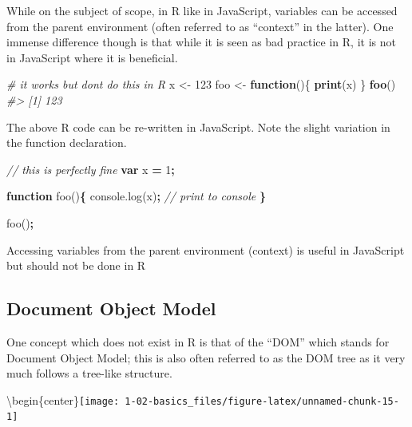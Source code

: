 \documentclass[
]{krantz}
\makeatletter
\newenvironment{Shaded}{\begin{snugshade}}{\end{snugshade}}
\newcommand{\AttributeTok}[1]{\textcolor[rgb]{0.61,0.61,0.61}{#1}}
\newcommand{\CommentTok}[1]{\textcolor[rgb]{0.37,0.37,0.37}{\textit{#1}}}
\newcommand{\ControlFlowTok}[1]{\textcolor[rgb]{0.27,0.27,0.27}{\textbf{#1}}}
\newcommand{\DecValTok}[1]{\textcolor[rgb]{0.06,0.06,0.06}{#1}}
\newcommand{\KeywordTok}[1]{\textcolor[rgb]{0.27,0.27,0.27}{\textbf{#1}}}
\newcommand{\NormalTok}[1]{#1}
\newcommand{\OperatorTok}[1]{\textcolor[rgb]{0.43,0.43,0.43}{\textbf{#1}}}
\newcommand{\StringTok}[1]{\textcolor[rgb]{0.5,0.5,0.5}{#1}}
\newcommand{\VariableTok}[1]{\textcolor[rgb]{0,0,0}{#1}}
\newenvironment{kframe}{%
\medskip{}
\setlength{\fboxsep}{.8em}
 \def\at@end@of@kframe{}%
 \ifinner\ifhmode%
  \def\at@end@of@kframe{\end{minipage}}%
  \begin{minipage}{\columnwidth}%
 \fi\fi%
 \def\FrameCommand##1{\hskip\@totalleftmargin \hskip-\fboxsep
 \colorbox{shadecolor}{##1}\hskip-\fboxsep
     \hskip-\linewidth \hskip-\@totalleftmargin \hskip\columnwidth}%
 \MakeFramed {\advance\hsize-\width
   \@totalleftmargin\z@ \linewidth\hsize
   \@setminipage}}%
 {\par\unskip\endMakeFramed%
 \at@end@of@kframe}
\renewenvironment{Shaded}{\begin{kframe}}{\end{kframe}}
\newenvironment{rmdblock}[1]
  {
  \begin{itemize}
  \renewcommand{\labelitemi}{
    \raisebox{-.7\height}[0pt][0pt]{
      {\setkeys{Gin}{width=3em,keepaspectratio}\texttt{[image: images/\#1]}}
    }
  }
  \setlength{\fboxsep}{1em}
  \begin{kframe}
  \item
  }
  {
  \end{kframe}
  \end{itemize}
  }
\newenvironment{rmdnote}
  {\begin{rmdblock}{note}}
  {\end{rmdblock}}
\makeatother
\begin{document}
While on the subject of scope, in R like in JavaScript, variables can be accessed from the parent environment (often referred to as ``context'' in the latter). One immense difference though is that while it is seen as bad practice in R, it is not in JavaScript where it is beneficial.

\begin{Shaded}
\begin{Highlighting}[]
\CommentTok{\# it works but don\textquotesingle{}t do this in R}
\NormalTok{x <{-}}\StringTok{ }\DecValTok{123}
\NormalTok{foo <{-}}\StringTok{ }\ControlFlowTok{function}\NormalTok{()\{}
  \KeywordTok{print}\NormalTok{(x)}
\NormalTok{\}}
\KeywordTok{foo}\NormalTok{()}
\CommentTok{\#> [1] 123}
\end{Highlighting}
\end{Shaded}

The above R code can be re-written in JavaScript. Note the slight variation in the function declaration.

\begin{Shaded}
\begin{Highlighting}[]
\CommentTok{// this is perfectly fine}
\KeywordTok{var}\NormalTok{ x }\OperatorTok{=} \DecValTok{1}\OperatorTok{;}

\KeywordTok{function} \AttributeTok{foo}\NormalTok{()}\OperatorTok{\{}
  \VariableTok{console}\NormalTok{.}\AttributeTok{log}\NormalTok{(x)}\OperatorTok{;} \CommentTok{// print to console}
\OperatorTok{\}}

\AttributeTok{foo}\NormalTok{()}\OperatorTok{;}
\end{Highlighting}
\end{Shaded}

\begin{rmdnote}
Accessing variables from the parent environment (context) is useful in
JavaScript but should not be done in R
\end{rmdnote}

\hypertarget{basics-object-model}{%
\subsection{Document Object Model}\label{basics-object-model}}

One concept which does not exist in R is that of the ``DOM'' which stands for Document Object Model; this is also often referred to as the DOM tree as it very much follows a tree-like structure.

\textbackslash begin\{center\}\texttt{[image: 1-02-basics\_files/figure-latex/unnamed-chunk-15-1]}
\end{document}
